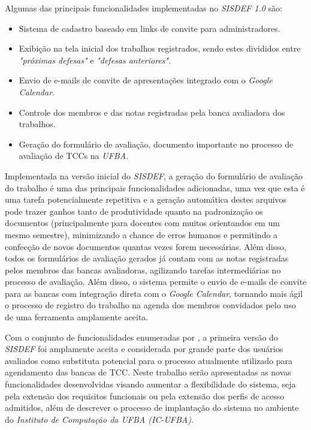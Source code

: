 \documentclass[nonacm, sigconf]{acmart}
\begin{document}
Algumas das principais funcionalidades implementadas no \textit{SISDEF 1.0} são:

\begin{itemize}
    \item Sistema de cadastro baseado em links de convite para administradores.
    \item Exibição na tela inicial dos trabalhos registrados, sendo estes divididos entre \textit{"próximas defesas"} e \textit{"defesas anteriores"}.
    \item Envio de e-mails de convite de apresentações integrado com o \textit{Google Calendar}.
    \item Controle dos membros e das notas registradas pela banca avaliadora dos trabalhos.
    \item Geração do formulário de avaliação, documento importante no processo de avaliação de TCCs na \textit{UFBA}.
\end{itemize}

Implementada na versão inicial do \textit{SISDEF}, a geração do formulário de avaliação do trabalho é uma das principais funcionalidades adicionadas, uma vez que esta é uma tarefa potencialmente repetitiva e a geração automática destes arquivos pode trazer ganhos tanto de produtividade quanto na padronização os documentos (principalmente para docentes com muitos orientandos em um mesmo semestre), minimizando a chance de erros humanos e permitindo a confecção de novos documentos quantas vezes forem necessárias. Além disso, todos os formulários de avaliação gerados já contam com as notas registradas pelos membros das bancas avaliadoras, agilizando tarefas intermediárias no processo de avaliação. Além disso, o sistema permite o envio de e-mails de convite para as bancas com integração direta com o \textit{Google Calendar}, tornando mais ágil o processo de registro do trabalho na agenda dos membros convidados pelo uso de uma ferramenta amplamente aceita.

Com o conjunto de funcionalidades enumeradas por \cite{gabrieltcc}, a primeira versão do \textit{SISDEF} foi amplamente aceita e considerada por grande parte dos usuários avaliados como substituta potencial para o processo atualmente utilizado para agendamento das bancas de TCC. Neste trabalho serão apresentadas as novas funcionalidades desenvolvidas visando aumentar a flexibilidade do sistema, seja pela extensão dos requisitos funcionais ou pela extensão dos perfis de acesso admitidos, além de descrever o processo de implantação do sistema no ambiente do \textit{Instituto de Computação da UFBA (IC-UFBA)}. 
\end{document}
